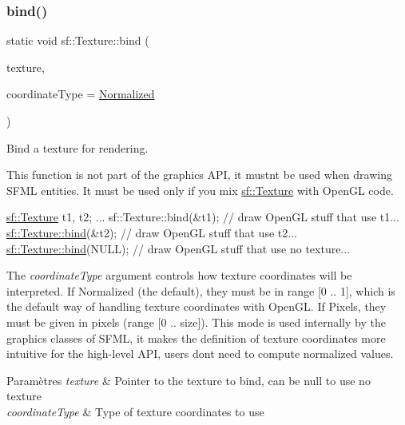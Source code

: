 \subsubsection{\texorpdfstring{bind()}{bind()}}
{\footnotesize\ttfamily static void sf\+::\+Texture\+::bind (\begin{DoxyParamCaption}\item[{const \hyperlink{classsf_1_1Texture}{Texture} $\ast$}]{texture,  }\item[{\hyperlink{classsf_1_1Texture_aa6fd3bbe3c334b3c4428edfb2765a82e}{Coordinate\+Type}}]{coordinate\+Type = {\ttfamily \hyperlink{classsf_1_1Texture_aa6fd3bbe3c334b3c4428edfb2765a82ea69d6228950882e4d68be4ba4dbe7df73}{Normalized}} }\end{DoxyParamCaption})\hspace{0.3cm}{\ttfamily [static]}}



Bind a texture for rendering. 

This function is not part of the graphics A\+PI, it mustn\textquotesingle{}t be used when drawing S\+F\+ML entities. It must be used only if you mix \hyperlink{classsf_1_1Texture}{sf\+::\+Texture} with Open\+GL code.


\begin{DoxyCode}
\hyperlink{classsf_1_1Texture}{sf::Texture} t1, t2;
...
sf::Texture::bind(&t1);
\textcolor{comment}{// draw OpenGL stuff that use t1...}
\hyperlink{classsf_1_1Texture_ae9a4274e7b95ebf7244d09c7445833b0}{sf::Texture::bind}(&t2);
\textcolor{comment}{// draw OpenGL stuff that use t2...}
\hyperlink{classsf_1_1Texture_ae9a4274e7b95ebf7244d09c7445833b0}{sf::Texture::bind}(NULL);
\textcolor{comment}{// draw OpenGL stuff that use no texture...}
\end{DoxyCode}


The {\itshape coordinate\+Type} argument controls how texture coordinates will be interpreted. If Normalized (the default), they must be in range \mbox{[}0 .. 1\mbox{]}, which is the default way of handling texture coordinates with Open\+GL. If Pixels, they must be given in pixels (range \mbox{[}0 .. size\mbox{]}). This mode is used internally by the graphics classes of S\+F\+ML, it makes the definition of texture coordinates more intuitive for the high-\/level A\+PI, users don\textquotesingle{}t need to compute normalized values.


\begin{DoxyParams}{Paramètres}
{\em texture} & Pointer to the texture to bind, can be null to use no texture \\
\hline
{\em coordinate\+Type} & Type of texture coordinates to use \\
\hline
\end{DoxyParams}
\mbox{\label{classsf_1_1Texture_a77e18a70de2e525ac5e4a7cd95f614b9}} 
